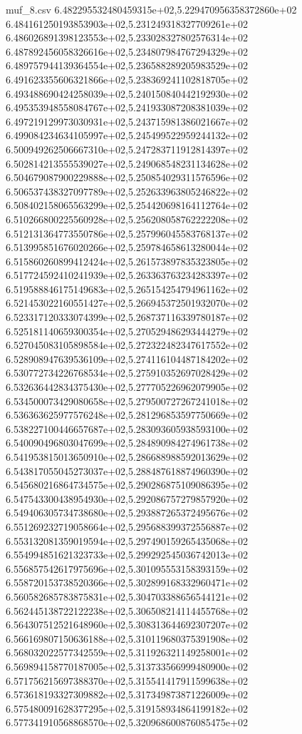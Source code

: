 \begin{filecontents*}{muf_8.csv}
6.482295532480459315e+02,5.229470956358372860e+02
6.484161250193853903e+02,5.231249318327709261e+02
6.486026891398123553e+02,5.233028327802576314e+02
6.487892456058326616e+02,5.234807984767294329e+02
6.489757944139364554e+02,5.236588289205983529e+02
6.491623355606321866e+02,5.238369241102818705e+02
6.493488690424258039e+02,5.240150840442192930e+02
6.495353948558084767e+02,5.241933087208381039e+02
6.497219129973030931e+02,5.243715981386021667e+02
6.499084234634105997e+02,5.245499522959244132e+02
6.500949262506667310e+02,5.247283711912814397e+02
6.502814213555539027e+02,5.249068548231134628e+02
6.504679087900229888e+02,5.250854029311576596e+02
6.506537438327097789e+02,5.252633963805246822e+02
6.508402158065563299e+02,5.254420698164112764e+02
6.510266800225560928e+02,5.256208058762222208e+02
6.512131364773550786e+02,5.257996045583768137e+02
6.513995851676020266e+02,5.259784658613280044e+02
6.515860260899412424e+02,5.261573897835323805e+02
6.517724592410241939e+02,5.263363763234283397e+02
6.519588846175149683e+02,5.265154254794961162e+02
6.521453022160551427e+02,5.266945372501932070e+02
6.523317120333074399e+02,5.268737116339780187e+02
6.525181140659300354e+02,5.270529486293444279e+02
6.527045083105898584e+02,5.272322482347617552e+02
6.528908947639536109e+02,5.274116104487184202e+02
6.530772734226768534e+02,5.275910352697028429e+02
6.532636442834375430e+02,5.277705226962079905e+02
6.534500073429080658e+02,5.279500727267241018e+02
6.536363625977576248e+02,5.281296853597750669e+02
6.538227100446657687e+02,5.283093605938593100e+02
6.540090496803047699e+02,5.284890984274961738e+02
6.541953815013650910e+02,5.286688988592013629e+02
6.543817055045273037e+02,5.288487618874960390e+02
6.545680216864734575e+02,5.290286875109086395e+02
6.547543300438954930e+02,5.292086757279857920e+02
6.549406305734738680e+02,5.293887265372495676e+02
6.551269232719058664e+02,5.295688399372556887e+02
6.553132081359019594e+02,5.297490159265435068e+02
6.554994851621323733e+02,5.299292545036742013e+02
6.556857542617975696e+02,5.301095553158393159e+02
6.558720153738520366e+02,5.302899168332960471e+02
6.560582685783875831e+02,5.304703388656544121e+02
6.562445138722122238e+02,5.306508214114455768e+02
6.564307512521648960e+02,5.308313644692307207e+02
6.566169807150636188e+02,5.310119680375391908e+02
6.568032022577342559e+02,5.311926321149258001e+02
6.569894158770187005e+02,5.313733566999480900e+02
6.571756215697388370e+02,5.315541417911599638e+02
6.573618193327309882e+02,5.317349873871226009e+02
6.575480091628377295e+02,5.319158934864199182e+02
6.577341910568868570e+02,5.320968600876085475e+02

\end{filecontents*}
